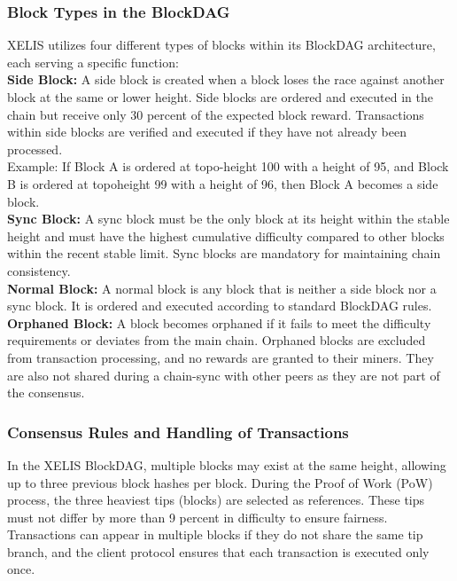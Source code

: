 \documentclass[10pt,a4paper,twocolumn]{article}
\begin{document}
\subsubsection{Block Types in the BlockDAG}

XELIS utilizes four different types of blocks within its BlockDAG architecture, each serving a specific function:\\

\textbf{Side Block:} A side block is created when a block loses the race against another block at the same or lower height. Side blocks are ordered and executed in the chain but receive only 30 percent of the expected block reward. Transactions within side blocks are verified and executed if they have not already been processed.\\

Example:
If Block A is ordered at topo-height 100 with a height of 95, and Block B is ordered at topoheight 99 with a height of 96, then Block A becomes a side block.\\

\textbf{Sync Block:} A sync block must be the only block at its height within the stable height and must have the highest cumulative difficulty compared to other blocks within the recent stable limit. Sync blocks are mandatory for maintaining chain consistency.\\

\textbf{Normal Block:} A normal block is any block that is neither a side block nor a sync block. It is ordered and executed according to standard BlockDAG rules.\\

\textbf{Orphaned Block:} A block becomes orphaned if it fails to meet the difficulty requirements or deviates from the main chain. Orphaned blocks are excluded from transaction processing, and no rewards are granted to their miners. They are also not shared during a chain-sync with other peers as they are not part of the consensus.

\subsubsection{Consensus Rules and Handling of Transactions}

In the XELIS BlockDAG, multiple blocks may exist at the same height, allowing up to three previous block hashes per block. During the Proof of Work (PoW) process, the three heaviest tips (blocks) are selected as references. These tips must not differ by more than 9 percent in difficulty to ensure fairness. Transactions can appear in multiple blocks if they do not share the same tip branch, and the client protocol ensures that each transaction is executed only once.\\
\end{document}
